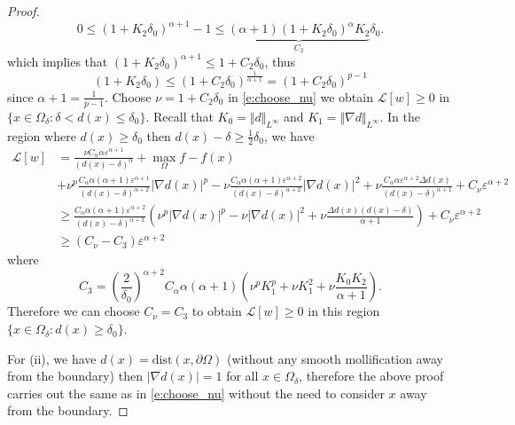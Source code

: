 \documentclass[11pt,reqno]{amsart}
\numberwithin{figure}{section}
\theoremstyle{plain}
\theoremstyle{remark}
\numberwithin{equation}{section}
\begin{document}
\begin{proof}
\begin{equation*}
     0 \leq (1+K_2\delta_0)^{\alpha+1} - 1 \leq\underbrace{(\alpha+1)\left(1+K_2\delta_0\right)^\alpha K_2}_{C_2}\delta_0.
\end{equation*}
which implies that $(1+K_2\delta_0)^{\alpha+1} \leq 1 + C_2\delta_0$, thus
\begin{equation}\label{e:cru1}
    (1+K_2\delta_0) \leq (1+C_2\delta_0)^{\frac{1}{\alpha+1}} = (1+C_2\delta_0)^{p-1}
\end{equation}
since $\alpha+1 = \frac{1}{p-1}$. Choose $\nu = 1+C_2\delta_0$ in \eqref{e:choose_nu} we obtain $\mathcal{L}[w]\geq 0$ in $\{x\in \Omega_\delta: \delta <d(x)\leq \delta_0\}$. Recall that $K_0 = \Vert d\Vert_{L^\infty}$ and $K_1 = \Vert \nabla d\Vert_{L^\infty}$. In the region where $d(x)\geq \delta_0$ then $d(x)-\delta \geq \frac{1}{2}\delta_0$, we have 
\begin{align*}
    \mathcal{L}[w] &= \frac{\nu C_\alpha\alpha\varepsilon^{\alpha+1}}{(d(x)-\delta)^\alpha} + \max_{\Omega} f - f(x)\\
    &+  \nu^p\frac{C_\alpha\alpha(\alpha+1)\varepsilon^{\alpha+1}}{(d(x)-\delta)^{\alpha+2}}|\nabla d(x)|^p - \nu \frac{C_\alpha \alpha(\alpha+1)\varepsilon^{\alpha+2}}{(d(x)-\delta)^{\alpha+2}}|\nabla d(x)|^2 
    + \nu \frac{C_\alpha \alpha \varepsilon^{\alpha+2}\Delta d(x)}{(d(x)-\delta)^{\alpha+1}} + C_\nu \varepsilon^{\alpha+2}\\
    &\geq \frac{C_\alpha \alpha(\alpha+1)\varepsilon^{\alpha+2}}{(d(x)-\delta)^{\alpha+2}}\left(\nu^p|\nabla d(x)|^p - \nu |\nabla d(x)|^2 + \nu \frac{\Delta d(x)(d(x)-\delta)}{\alpha+1}\right) + C_\nu \varepsilon^{\alpha+2}\\
    &\geq (C_\nu - C_3)\varepsilon^{\alpha+2}
\end{align*}
where 
\begin{equation*}
    C_3 = \left(\frac{2}{\delta_0}\right)^{\alpha+2} C_\alpha\alpha(\alpha+1) \left(\nu^pK_1^p + \nu K_1^2 + \nu \frac{K_0K_2}{\alpha+1}\right).
\end{equation*}
Therefore we can choose $C_\nu = C_3$ to obtain $\mathcal{L}[w]\geq 0$ in this region $\{x\in \Omega_\delta:d(x)\geq \delta_0\}$.

For (ii), we have $d(x) = \mathrm{dist}(x,\partial\Omega)$ (without any smooth mollification away from the boundary) then $|\nabla d(x)| = 1$ for all $x\in \Omega_\delta$, therefore the above proof carries out the same as in \eqref{e:choose_nu} without the need to consider $x$ away from the boundary.
\end{proof}
\end{document}
